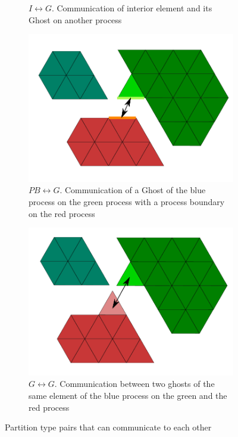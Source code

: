 \begin{figure}
\begin{subfigure}[b]{0.48\textwidth}
	  \captionsetup{width=0.8\textwidth} 
	  \caption{$I \leftrightarrow G$. Communication of interior element and its Ghost on another process }
	\end{subfigure}
	\begin{subfigure}[b]{0.48\textwidth}
	  \includegraphics[scale=0.4]{images/parallel-comm-PBG}
	  \captionsetup{width=0.8\textwidth} 
	  \caption{$PB \leftrightarrow G$. Communication of a Ghost of the blue process on the green process with a process boundary on the red process}
	\end{subfigure}
	\begin{subfigure}[b]{0.48\textwidth}
	  \includegraphics[scale=0.4]{images/parallel-comm-GG}
	  \captionsetup{width=0.8\textwidth} 
	  \caption{$G \leftrightarrow G$. Communication between two ghosts of the same element of the blue process on the green and the red process}
	\end{subfigure}
	\captionsetup{width=0.8\textwidth}
	\caption{ Partition type pairs that can communicate to each other}
	\label{fig:impl:comm:partitionpairs}
\end{figure}

